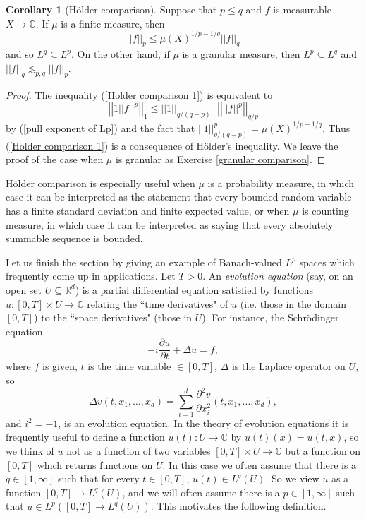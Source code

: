 \documentclass[12pt]{book}
\newcommand{\RR}{\mathbb{R}}
\newcommand{\CC}{\mathbb{C}}
\newcommand{\dfn}[1]{\emph{#1}\index{#1}}
\theoremstyle{definition}
\newtheorem{corollary}[theorem]{Corollary}
\begin{document}
\begin{corollary}[H\"older comparison]
\label{Holder comparison}
Suppose that $p \leq q$ and $f$ is measurable $X \to \CC$.
If $\mu$ is a finite measure, then
\begin{equation}
\label{Holder comparison 1}
||f||_p \leq \mu(X)^{1/p-1/q} ||f||_q
\end{equation}
and so $L^q \subseteq L^p$.
On the other hand, if $\mu$ is a granular measure, then $L^p \subseteq L^q$ and $||f||_q \lesssim_{p,q} ||f||_p$.
\end{corollary}
\begin{proof}
The inequality (\ref{Holder comparison 1}) is equivalent to
$$\left|\left|1 ||f||^p\right|\right|_1 \leq ||1||_{q/(q-p)} \cdot \left|\left| ||f||^p\right|\right|_{q/p}$$
by (\ref{pull exponent of Lp}) and the fact that $||1||_{q/(q-p)}^p = \mu(X)^{1/p-1/q}$.
Thus (\ref{Holder comparison 1}) is a consequence of H\"older's inequality.
We leave the proof of the case when $\mu$ is granular as Exercise \ref{granular comparison}.
\end{proof}

H\"older comparison is especially useful when $\mu$ is a probability measure, in which case it can be interpreted as the statement that every bounded random variable has a finite standard deviation and finite expected value, or when $\mu$ is counting measure, in which case it can be interpreted as saying that every absolutely summable sequence is bounded.

Let us finish the section by giving an example of Banach-valued $L^p$ spaces which frequently come up in applications.
Let $T > 0$. An \dfn{evolution equation} (say, on an open set $U \subseteq \RR^d$) is a partial differential equation satisfied by functions $u: [0, T] \times U \to \CC$ relating the ``time derivatives" of $u$ (i.e. those in the domain $[0, T]$) to the ``space derivatives" (those in $U$).
For instance, the Schr\"odinger equation
$$-i\frac{\partial u}{\partial t} + \Delta u = f,$$
where $f$ is given, $t$ is the time variable $\in [0, T]$, $\Delta$ is the Laplace operator on $U$, so
$$\Delta v(t, x_1, \dots, x_d) = \sum_{i=1}^d \frac{\partial^2 v}{\partial x_i^2} (t, x_1, \dots, x_d), $$
and $i^2 = -1$, is an evolution equation.
In the theory of evolution equations it is frequently useful to define a function $u(t): U \to \CC$ by $u(t)(x) = u(t, x)$, so we think of $u$ not as a function of two variables $[0, T] \times U \to \CC$ but a function on $[0, T]$ which returns functions on $U$.
In this case we often assume that there is a $q \in [1, \infty]$ such that for every $t \in [0, T]$, $u(t) \in L^q(U)$.
So we view $u$ as a function $[0, T] \to L^q(U)$, and we will often assume there is a $p \in [1, \infty]$ such that $u \in L^p([0, T] \to L^q(U))$.
This motivates the following definition.
\end{document}
